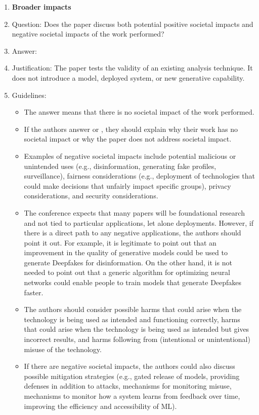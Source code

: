 \begin{enumerate}
\item {\bf Broader impacts}
    \item[] Question: Does the paper discuss both potential positive societal impacts and negative societal impacts of the work performed?
    \item[] Answer: \answerNA{}
    \item[] Justification: The paper tests the validity of an existing analysis technique. It does not introduce a model, deployed system, or new generative capability.
    \item[] Guidelines:
    \begin{itemize}
        \item The answer \answerNA{} means that there is no societal impact of the work performed.
        \item If the authors answer \answerNA{} or \answerNo, they should explain why their work has no societal impact or why the paper does not address societal impact.
        \item Examples of negative societal impacts include potential malicious or unintended uses (e.g., disinformation, generating fake profiles, surveillance), fairness considerations (e.g., deployment of technologies that could make decisions that unfairly impact specific groups), privacy considerations, and security considerations.
        \item The conference expects that many papers will be foundational research and not tied to particular applications, let alone deployments. However, if there is a direct path to any negative applications, the authors should point it out. For example, it is legitimate to point out that an improvement in the quality of generative models could be used to generate Deepfakes for disinformation. On the other hand, it is not needed to point out that a generic algorithm for optimizing neural networks could enable people to train models that generate Deepfakes faster.
        \item The authors should consider possible harms that could arise when the technology is being used as intended and functioning correctly, harms that could arise when the technology is being used as intended but gives incorrect results, and harms following from (intentional or unintentional) misuse of the technology.
        \item If there are negative societal impacts, the authors could also discuss possible mitigation strategies (e.g., gated release of models, providing defenses in addition to attacks, mechanisms for monitoring misuse, mechanisms to monitor how a system learns from feedback over time, improving the efficiency and accessibility of ML).
    \end{itemize}
    

\end{enumerate}
